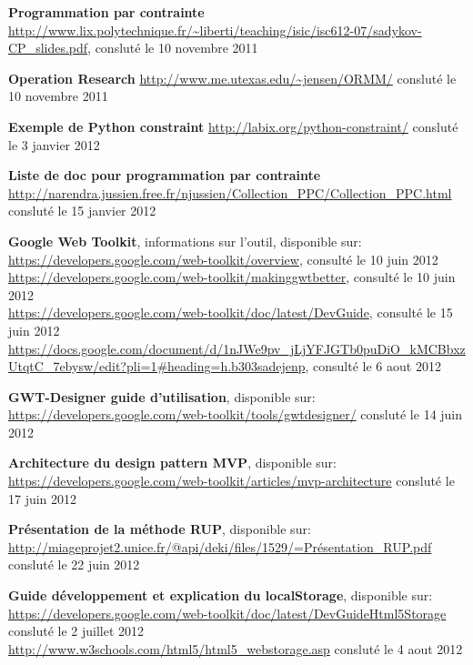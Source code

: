 \begin{thebibliography}{99}
\bibitem{}\textbf{Programmation par contrainte} \newline
\url{http://www.lix.polytechnique.fr/~liberti/teaching/isic/isc612-07/sadykov-CP_slides.pdf}, consluté le 10 novembre 2011

\bibitem{}\textbf{Operation Research} \newline
\url{http://www.me.utexas.edu/~jensen/ORMM/} consluté le 10 novembre 2011

\bibitem{}\textbf{Exemple de Python constraint}  \newline
\url{http://labix.org/python-constraint/} consluté le 3 janvier 2012

\bibitem{}\textbf{Liste de doc pour programmation par contrainte} \newline
\url{http://narendra.jussien.free.fr/njussien/Collection_PPC/Collection_PPC.html} consluté le 15 janvier 2012

\bibitem{} \textbf{Google Web Toolkit}, informations sur l'outil, disponible sur:\newline
\url{https://developers.google.com/web-toolkit/overview}, consulté le 10 juin 2012\\
\url{https://developers.google.com/web-toolkit/makinggwtbetter}, consulté le 10 juin 2012\\
\url{https://developers.google.com/web-toolkit/doc/latest/DevGuide}, consulté le 15 juin 2012 \\
\url{https://docs.google.com/document/d/1nJWe9pv_jLjYFJGTb0puDiO_kMCBbxzUtqtC_7ebysw/edit?pli=1\#heading=h.b303sadejenp}, consulté le 6 aout 2012

\bibitem{}\textbf{GWT-Designer guide d'utilisation}, disponible sur:\newline
\url{https://developers.google.com/web-toolkit/tools/gwtdesigner/}  consluté le 14 juin 2012

\bibitem{}\textbf{Architecture du design pattern MVP}, disponible sur: \newline
\url{https://developers.google.com/web-toolkit/articles/mvp-architecture} consluté le 17 juin 2012

\bibitem{}\textbf{Présentation de la méthode RUP}, disponible sur: \newline
\url{http://miageprojet2.unice.fr/@api/deki/files/1529/=Présentation_RUP.pdf} consluté le 22 juin 2012

\bibitem{}\textbf{Guide développement et explication du localStorage}, disponible sur: \newline
\url{https://developers.google.com/web-toolkit/doc/latest/DevGuideHtml5Storage} consluté le 2 juillet 2012 \\
\url{http://www.w3schools.com/html5/html5_webstorage.asp} consluté le 4 aout 2012


\end{thebibliography}
